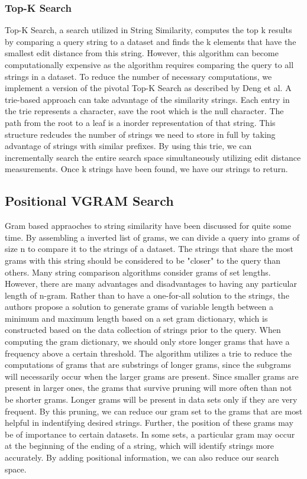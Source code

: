 \documentclass[pdftex,12pt,letter]{article}
\begin{document}
\subsubsection{Top-K Search}
Top-K Search, a search utilized in String Similarity, computes the top k results by comparing a query string to a dataset and finds the k elements that have the smallest edit distance from this string. However, this algorithm can become computationally expensive as the algorithm requires comparing the query to all strings in a dataset. To reduce the number of necessary computations, we implement a version of the pivotal Top-K Search as described by Deng et al. A trie-based approach can take advantage of the similarity strings. Each entry in the trie represents a character, save the root which is the null character. The path from the root to a leaf is a inorder representation of that string. This structure redcudes the number of strings we need to store in full by taking advantage of strings with similar prefixes. By using this trie, we can incrementally search the entire search space simultaneously utilizing edit distance measurements. Once k strings have been found, we have our strings to return. 

\subsection{Positional VGRAM Search}

Gram based appraoches to string similarity have been discussed for quite some time. By assembling a inverted list of grams, we can divide a query into grams of size n to compare it to the strings of a dataset. The strings that share the most grams with this string should be considered to be "closer" to the query than others. Many string comparison algorithms consider grams of set lengths. However, there are many advantages and disadvantages to having any particular length of n-gram. Rather than to have a one-for-all solution to the strings, the authors propose a solution to generate grams of variable length between a minimum and maximum length based on a set gram dictionary, which is constructed based on the data collection of strings prior to the query. When computing the gram dictionary, we should only store longer grams that have a frequency above a certain threshold. The algorithm utilizes a trie to reduce the computations of grams that are substrings of longer grams, since the subgrams will necessarily occur when the larger grams are present. Since smaller grams are present in larger ones, the grams that survive pruning will more often than not be shorter grams. Longer grams will be present in data sets only if they are very frequent. By this pruning, we can reduce our gram set to the grams that are most helpful in indentifying desired strings. Further, the position of these grams may be of importance to certain datasets. In some sets, a particular gram may occur at the beginning of the ending of a string, which will identify strings more accurately. By adding positional information, we can also reduce our search space. 
\end{document}
